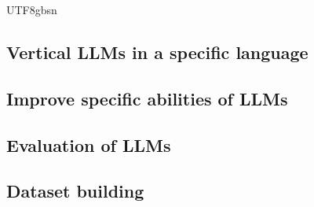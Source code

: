 \documentclass{article}%
\begin{document}
\begin{CJK}{UTF8}{gbsn}
\label{sec:project topics}

\subsection{Vertical LLMs in a specific language}

\subsection{Improve specific abilities of LLMs}

\subsection{Evaluation of LLMs}

\subsection{Dataset building}









\end{CJK}
\end{document}
